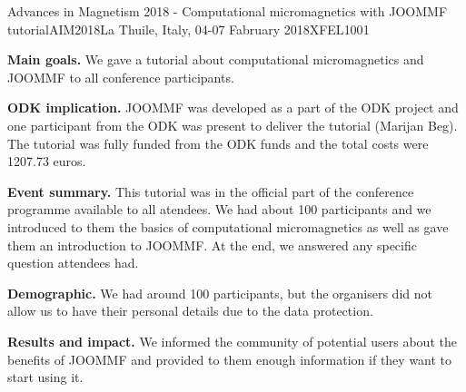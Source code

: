 \begin{event}{Advances in Magnetism 2018 - Computational micromagnetics with JOOMMF tutorial}{AIM2018}{La Thuile, Italy, 04-07 Fabruary 2018}{XFEL}{100}{1}{}

\textbf{Main goals.} We gave a tutorial about computational micromagnetics and JOOMMF to all conference participants.

\textbf{ODK implication.} JOOMMF was developed as a part of the ODK project and one participant from the ODK was present to deliver the tutorial (Marijan Beg). The tutorial was fully funded from the ODK funds and the total costs were 1207.73 euros.

\textbf{Event summary.} This tutorial was in the official part of the conference programme available to all atendees. We had about 100 participants and we introduced to them the basics of computational micromagnetics as well as gave them an introduction to JOOMMF. At the end, we answered any specific question attendees had.

\textbf{Demographic.} We had around 100 participants, but the organisers did not allow us to have their personal details due to the data protection.

\textbf{Results and impact.} We informed the community of potential users about the benefits of JOOMMF and provided to them enough information if they want to start using it.

\end{event}
